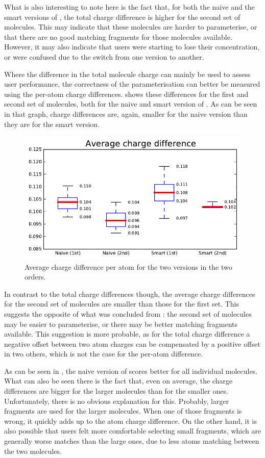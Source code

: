 What is also interesting to note here is the fact that, for both the naive and the smart versions of \oframp, the total charge difference is higher for the second set of molecules. This may indicate that these molecules are harder to parameterise, or that there are no good matching fragments for those molecules available. However, it may also indicate that users were starting to lose their concentration, or were confused due to the switch from one version to another.

Where the difference in the total molecule charge can mainly be used to assess user performance, the correctness of the parameterisation can better be measured using the per-atom charge differences.  shows these differences for the first and second set of molecules, both for the naive and smart version of \oframp. As can be seen in that graph, charge differences are, again, smaller for the naive version than they are for the smart version.

\begin{figure}[h!]
\center
\includegraphics[width=.6\textwidth]{img/graphs/1a_01.pdf}
\caption{Average charge difference per atom for the two versions in the two orders.}
\end{figure}

In contrast to the total charge differences though, the average charge differences for the second set of molecules are smaller than those for the first set. This suggests the opposite of what was concluded from : the second set of molecules may be easier to parameterise, or there may be better matching fragments available. This suggestion is more probable, as for the total charge difference a negative offset between two atom charges can be compensated by a positive offset in two others, which is not the case for the per-atom difference.

As can be seen in , the naive version of \oframp{} scores better for all individual molecules. What can also be seen there is the fact that, even on average, the charge differences are bigger for the larger molecules than for the smaller ones. Unfortunately, there is no obvious explanation for this. Probably, larger fragments are used for the larger molecules. When one of those fragments is wrong, it quickly adds up to the atom charge difference. On the other hand, it is also possible that users felt more comfortable selecting small fragments, which are generally worse matches than the large ones, due to less atoms matching between the two molecules.

